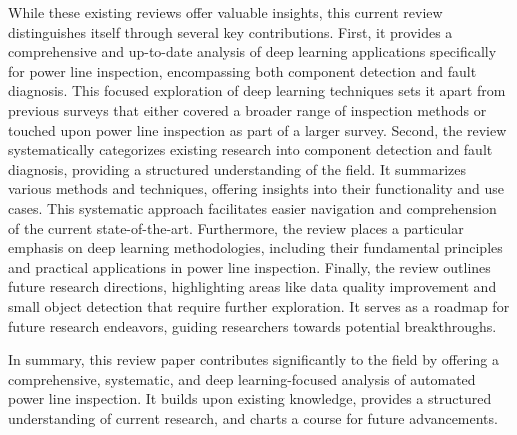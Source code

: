While these existing reviews offer valuable insights, this current review distinguishes itself through several key contributions. First, it provides a comprehensive and up-to-date analysis of deep learning applications specifically for power line inspection, encompassing both component detection and fault diagnosis. This focused exploration of deep learning techniques sets it apart from previous surveys that either covered a broader range of inspection methods or touched upon power line inspection as part of a larger survey. Second, the review systematically categorizes existing research into component detection and fault diagnosis, providing a structured understanding of the field. It summarizes various methods and techniques, offering insights into their functionality and use cases. This systematic approach facilitates easier navigation and comprehension of the current state-of-the-art. Furthermore, the review places a particular emphasis on deep learning methodologies, including their fundamental principles and practical applications in power line inspection. Finally, the review outlines future research directions, highlighting areas like data quality improvement and small object detection that require further exploration. It serves as a roadmap for future research endeavors, guiding researchers towards potential breakthroughs.

In summary, this review paper contributes significantly to the field by offering a comprehensive, systematic, and deep learning-focused analysis of automated power line inspection. It builds upon existing knowledge, provides a structured understanding of current research, and charts a course for future advancements.
